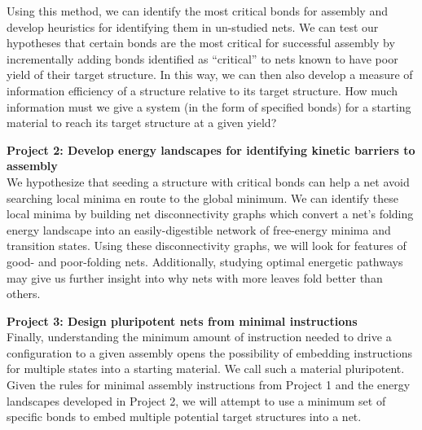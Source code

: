 Using this method, we can identify the most critical bonds for assembly and develop heuristics for identifying them in un-studied nets.
We can test our hypotheses that certain bonds are the most critical for successful assembly by incrementally adding bonds identified as ``critical'' to nets known to have poor yield of their target structure.
In this way, we can then also develop a measure of information efficiency of a structure relative to its target structure.
How much information must we give a system (in the form of specified bonds) for a starting material to reach its target structure at a given yield?

\textbf{Project 2: Develop energy landscapes for identifying kinetic barriers to assembly} \\
We hypothesize that seeding a structure with critical bonds can help a net avoid searching local minima en route to the global minimum. 
We can identify these local minima by building net disconnectivity graphs which convert a net's folding energy landscape into an easily-digestible network of free-energy minima and transition states.
Using these disconnectivity graphs, we will look for features of good- and poor-folding nets. 
Additionally, studying optimal energetic pathways may give us further insight into why nets with more leaves fold better than others.

\textbf{Project 3: Design pluripotent nets from minimal instructions} \\
Finally, understanding the minimum amount of instruction needed to drive a configuration to a given assembly opens the possibility of embedding instructions for multiple states into a starting material.
We call such a material pluripotent. 
Given the rules for minimal assembly instructions from Project 1 and the energy landscapes developed in Project 2, we will attempt to use a minimum set of specific bonds to embed multiple potential target structures into a net.

